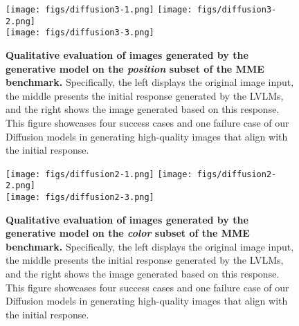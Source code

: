 \begin{figure}[t]
\centering
\texttt{[image: figs/diffusion3-1.png]}
\texttt{[image: figs/diffusion3-2.png]}
\\[5pt]
\texttt{[image: figs/diffusion3-3.png]}
\vspace{-10pt}
\caption{\textbf{Qualitative evaluation of images generated by the generative model on the \textit{position} subset of the MME benchmark.} Specifically, the left displays the original image input, the middle presents the initial response generated by the LVLMs, and the right  shows the image generated based on this response. This figure showcases four success cases and one failure case of our Diffusion models in generating high-quality images that align with the initial response.}
\label{fig:diffusion3}
\end{figure}

\begin{figure}[t]
\centering
\texttt{[image: figs/diffusion2-1.png]}
\texttt{[image: figs/diffusion2-2.png]}
\\[5pt]
\texttt{[image: figs/diffusion2-3.png]}
\vspace{-10pt}
\caption{\textbf{Qualitative evaluation of images generated by the generative model on the \textit{color} subset of the MME benchmark.} Specifically, the left displays the original image input, the middle presents the initial response generated by the LVLMs, and the right  shows the image generated based on this response. This figure showcases four success cases and one failure case of our Diffusion models in generating high-quality images that align with the initial response.}
\label{fig:diffusion4}
\end{figure}


